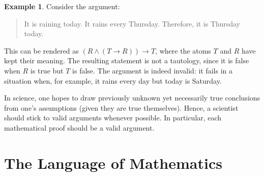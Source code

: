 \documentclass[12pt,notitlepage]{article}
\theoremstyle{plain}
\theoremstyle{definition}
\newtheorem{exm}[thm]{Example}
\theoremstyle{plain}
\newcommand{\1}{\mathbf{1}}
\newcommand{\0}{\mathbf{0}}
\newcommand{\mcomm}[1]{}
\begin{document}
\begin{exm}
Consider the argument:
\begin{quote}
It is raining today. It rains every Thursday. Therefore, it is Thursday today.
\end{quote}
This can be rendered as $(R \wedge (T \to R)) \to T$, where the atoms $T$ and $R$ have kept their meaning. The resulting statement is not a tautology, since it is false when $R$ is true but $T$ is false. The argument is indeed invalid: it fails in a situation when, for example, it rains every day but today is Saturday.
\end{exm}

In science, one hopes to draw previously unknown yet necessarily true conclusions from one's assumptions (given they are true themselves). Hence, a scientist should stick to valid arguments whenever possible. In particular, each mathematical proof should be a valid argument.

\section{The Language of Mathematics}
\mcomm{This lecture continues the line of the previous one. A predicate is `defined' to be a syntactic function from names to statements, while quantifiers lack general definition (without advanced semantics, one could just identify them with variable binders). We (almost tacitly) generalize logical equivalence to the case of quantified statements and appeal routinely to the natural intuition of `existence' and `universality' as one usually does in mathematical proofs.}
\end{document}
